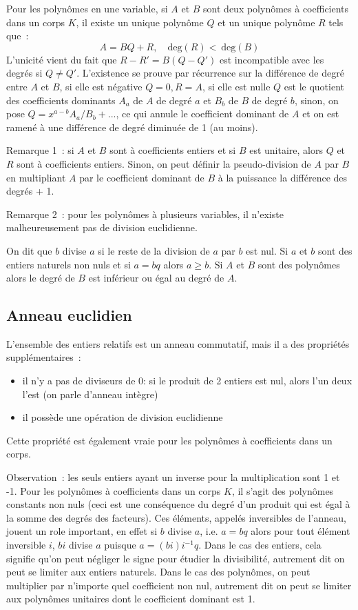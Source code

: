 \documentclass[a4paper,11pt]{book}
\begin{document}
\begin{giacjshere}
Pour les polyn\^omes en une variable,
si $A$ et $B$ sont deux polyn\^omes \`a coefficients
dans un corps $K$, il existe un unique polyn\^ome $Q$ et 
un unique polyn\^ome $R$ tels que~:
$$A=BQ+R, \quad \mbox{deg}(R)<\ \mbox{deg}(B) $$
L'unicit\'e vient du fait que $R-R'=B(Q-Q')$ est incompatible
avec les degr\'es si $Q \neq Q'$. L'existence se prouve par
r\'ecurrence sur la diff\'erence de degr\'e entre $A$ et $B$, si
elle est n\'egative $Q=0, R=A$, si elle est nulle $Q$ est le quotient
des coefficients dominants $A_a$ de $A$ de degr\'e $a$
et $B_b$ de $B$ de degr\'e $b$, sinon, on pose
$Q=x^{a-b} A_a/B_b+...$, ce qui annule le coefficient dominant de $A$
et on est ramen\'e \`a une diff\'erence de degr\'e diminu\'ee de 1 (au moins).

Remarque 1~: si $A$ et $B$ sont \`a coefficients entiers et si $B$
est unitaire, alors $Q$ et $R$ sont \`a coefficients entiers. Sinon,
on peut d\'efinir la pseudo-division de $A$ par $B$ en multipliant $A$ par le
coefficient dominant de $B$ \`a la puissance la diff\'erence des
degr\'es + 1.

Remarque 2~: pour les polyn\^omes \`a plusieurs variables,
il n'existe malheureusement pas de division euclidienne.

On dit que $b$ divise $a$ si le reste de la division de $a$ par $b$
est nul. 
Si $a$ et $b$ sont des entiers naturels non nuls et si $a=bq$  alors
$a \geq b$. Si $A$ et $B$ sont des polyn\^omes alors le degr\'e de $B$
est inf\'erieur ou \'egal au degr\'e de $A$.

\subsection{Anneau euclidien}
L'ensemble des entiers relatifs est un anneau commutatif, mais il a
des propri\'et\'es suppl\'ementaires~:
\begin{itemize}
\item il n'y a pas de diviseurs de 0: si le produit de 2 entiers
est nul, alors l'un deux l'est (on parle d'anneau int\`egre)
\item il poss\`ede une op\'eration de division euclidienne
\end{itemize}
Cette propri\'et\'e est \'egalement vraie pour
les polyn\^omes \`a coefficients dans un corps.
 
Observation~: les seuls entiers ayant un inverse pour la
multiplication sont 1 et -1. Pour les polyn\^omes \`a coefficients
dans un corps $K$, il s'agit des polyn\^omes constants non nuls
(ceci est une cons\'equence du degr\'e d'un produit qui est \'egal
\`a la somme des degr\'es des facteurs).
Ces \'el\'ements, appel\'es inversibles de l'anneau, jouent un role
important, en effet si $b$ divise $a$, i.e. $a=bq$ 
alors pour tout \'el\'ement inversible $i$, 
$bi$ divise $a$ puisque $a=(bi) i^{-1}q$.
Dans le cas des entiers, cela signifie qu'on peut n\'egliger le signe
pour \'etudier la divisibilit\'e, autrement dit on peut se limiter aux
entiers naturels. Dans le cas des polyn\^omes, on peut multiplier par
n'importe quel coefficient non nul, autrement dit on peut se limiter
aux polyn\^omes unitaires dont le coefficient dominant est 1.



\end{giacjshere}
\end{document}
